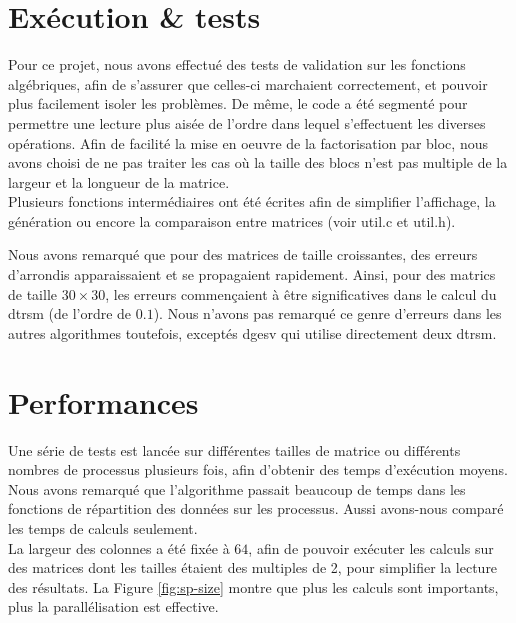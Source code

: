 \section{Exécution \& tests} %
\label{sec:execution}

Pour ce projet, nous avons effectué des tests de validation sur les fonctions algébriques, afin de s'assurer que celles-ci marchaient correctement, et pouvoir plus facilement isoler les problèmes. De même, le code a été segmenté pour permettre une lecture plus aisée de l'ordre dans lequel s'effectuent les diverses opérations. Afin de facilité la mise en oeuvre de la factorisation par bloc, nous avons choisi de ne pas traiter les cas où la taille des blocs n'est pas multiple de la largeur et la longueur de la matrice.\\

Plusieurs fonctions intermédiaires ont été écrites afin de simplifier l'affichage, la génération ou encore la comparaison entre matrices (voir util.c et util.h).

Nous avons remarqué que pour des matrices de taille croissantes, des erreurs d'arrondis apparaissaient et se propagaient rapidement. Ainsi, pour des matrics de taille $30 \times 30$, les erreurs commençaient à être significatives dans le calcul du dtrsm (de l'ordre de $0.1$). Nous n'avons pas remarqué ce genre d'erreurs dans les autres algorithmes toutefois, exceptés dgesv qui utilise directement deux dtrsm. 

\section{Performances} %
\label{sec:perf}

Une série de tests est lancée sur différentes tailles de matrice ou différents nombres de processus plusieurs fois, afin d'obtenir des temps d'exécution moyens. Nous avons remarqué que l'algorithme passait beaucoup de temps dans les fonctions de répartition des données sur les processus. Aussi avons-nous comparé les temps de calculs seulement. \\
La largeur des colonnes a été fixée à $64$, afin de pouvoir exécuter les calculs sur des matrices dont les tailles étaient des multiples de 2, pour simplifier la lecture des résultats. 
La Figure \ref{fig:sp-size} montre que plus les calculs sont importants, plus la parallélisation est effective.

